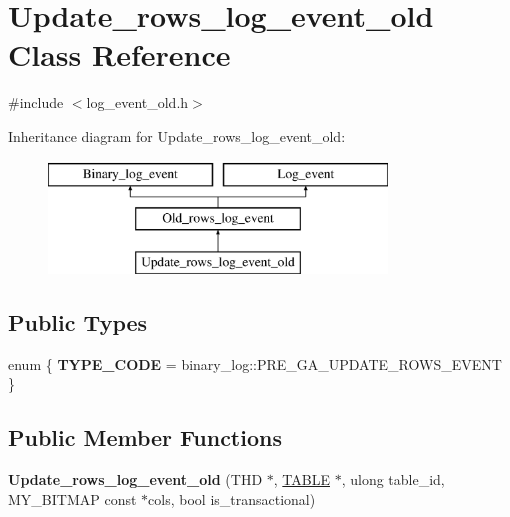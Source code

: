 \hypertarget{classUpdate__rows__log__event__old}{}\section{Update\+\_\+rows\+\_\+log\+\_\+event\+\_\+old Class Reference}
\label{classUpdate__rows__log__event__old}


{\ttfamily \#include $<$log\+\_\+event\+\_\+old.\+h$>$}

Inheritance diagram for Update\+\_\+rows\+\_\+log\+\_\+event\+\_\+old\+:\begin{figure}[H]
\begin{center}
\leavevmode
\includegraphics[height=3.000000cm]{classUpdate__rows__log__event__old}
\end{center}
\end{figure}
\subsection*{Public Types}
\begin{DoxyCompactItemize}
\item 
\mbox{\label{classUpdate__rows__log__event__old_a344cabef63f08898428c9886d44f41f7}} 
enum \{ {\bfseries T\+Y\+P\+E\+\_\+\+C\+O\+DE} = binary\+\_\+log\+:\+:P\+R\+E\+\_\+\+G\+A\+\_\+\+U\+P\+D\+A\+T\+E\+\_\+\+R\+O\+W\+S\+\_\+\+E\+V\+E\+NT
 \}
\end{DoxyCompactItemize}
\subsection*{Public Member Functions}
\begin{DoxyCompactItemize}
\item 
\mbox{\label{classUpdate__rows__log__event__old_ab7933adf390ecb61174b6e1d00b6f61b}} 
{\bfseries Update\+\_\+rows\+\_\+log\+\_\+event\+\_\+old} (T\+HD $\ast$, \mbox{\hyperlink{structTABLE}{T\+A\+B\+LE}} $\ast$, ulong table\+\_\+id, M\+Y\+\_\+\+B\+I\+T\+M\+AP const $\ast$cols, bool is\+\_\+transactional)
\end{DoxyCompactItemize}
